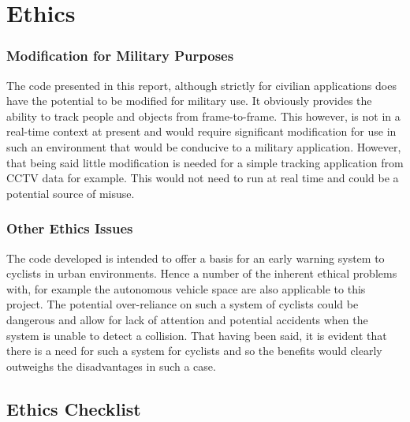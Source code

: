 \documentclass[11pt,twoside]{report}
\begin{document}
\newpage


\chapter{Ethics}

\subsection{Modification for Military Purposes}
The code presented in this report, although strictly for civilian applications does have the potential to be modified for military use. It obviously provides the ability to track people and objects from frame-to-frame. This however, is not in a real-time context at present and would require significant modification for use in such an environment that would be conducive to a military application. However, that being said little modification is needed for a simple tracking application from CCTV data for example. This would not need to run at real time and could be a potential source of misuse.

\subsection{Other Ethics Issues}

The code developed is intended to offer a basis for an early warning system to cyclists in urban environments. Hence a number of the inherent ethical problems with, for example the autonomous vehicle space are also applicable to this project. The potential over-reliance on such a system of cyclists could be dangerous and allow for lack of attention and potential accidents when the system is unable to detect a collision. That having been said, it is evident that there is a need for such a system for cyclists and so the benefits would clearly outweighs the disadvantages in such a case.

\section{Ethics Checklist}


\end{document}

